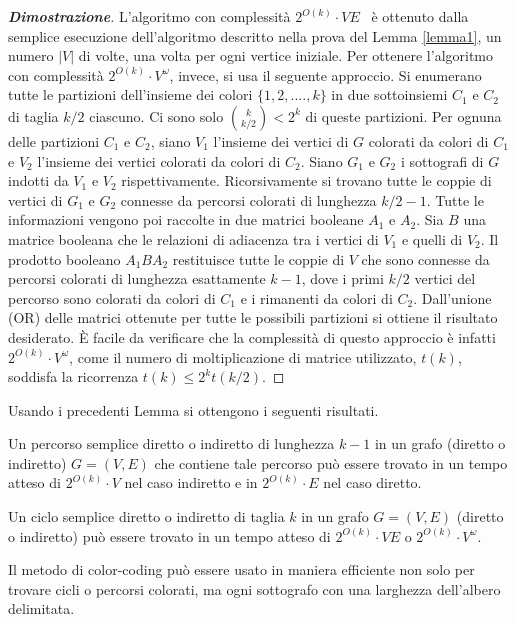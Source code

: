 \begin{proof}[\textbf{Dimostrazione}]
	L'algoritmo con complessit\`a $2^{O(k)} \cdot{VE}$  \ 
	\`e ottenuto dalla semplice esecuzione dell'algoritmo descritto nella prova del Lemma \ref{lemma1}, un numero $|V|$ di volte, una volta per ogni vertice iniziale.
	\newline
	Per ottenere l'algoritmo con complessit\`a $2^{O(k)}\cdot {V^{\omega}}$, invece, si usa il seguente approccio.
	Si enumerano tutte le partizioni dell'insieme dei colori $\{1,2,....,k\}$ in due sottoinsiemi $C_1$ e $C_2$ di taglia $k/2$ ciascuno.
	Ci sono solo $\binom{k}{k/2}<2^k$ di queste partizioni.
	Per ognuna delle partizioni $C_1$ e $C_2$, siano $V_1$ l'insieme dei vertici di $G$ colorati da colori di $C_1$ e $V_2$ l'insieme dei vertici colorati da colori di $C_2$.
	Siano $G_1$ e $G_2$ i sottografi di $G$ indotti da $V_1$ e $V_2$ rispettivamente.
	Ricorsivamente si trovano tutte le coppie di vertici di $ G_1 $ e $ G_2 $ connesse da percorsi colorati di lunghezza $ k/2-1 $.
	Tutte le informazioni vengono poi raccolte in due matrici booleane $ A_1 $ e $ A_2 $.
	Sia $ B $ una matrice booleana che le relazioni di adiacenza tra i vertici di $ V_1 $ e quelli di $ V_2 $.
	Il prodotto booleano $ A_1 B A_2 $ restituisce tutte le coppie di $ V $ che sono connesse da percorsi colorati di lunghezza esattamente $ k-1 $, dove i primi $ k/2 $ vertici del percorso sono colorati da colori di $ C_1 $ e i rimanenti da colori di $ C_2 $.
	Dall'unione (OR) delle matrici ottenute per tutte le possibili partizioni si ottiene il risultato desiderato.
	\`E facile da verificare che la complessit\`a di questo approccio \`e infatti $2^{O(k)}\cdot {V^{\omega}}$, come il numero di moltiplicazione di matrice utilizzato, $ t(k) $, soddisfa la ricorrenza $ t(k) \le 2^{k}t(k/2) $.
\end{proof}

Usando i precedenti Lemma si ottengono i seguenti risultati.

\begin{teorema}
	\label{teorema1}
	Un percorso semplice diretto o indiretto di lunghezza $ k-1 $ in un grafo (diretto o indiretto) $ G =(V,E) $ che contiene tale percorso pu\`o essere trovato in un tempo atteso di $ 2^{O(k)} \cdot V $ nel caso indiretto e in $ 2^{O(k)} \cdot E $ nel caso diretto.
\end{teorema}

\begin{teorema}
	\label{teorema2}
	Un ciclo semplice diretto o indiretto di taglia $ k $ in un grafo $ G=(V,E) $ (diretto o indiretto) pu\`o essere trovato in un tempo atteso di $2^{O(k)} \cdot{VE}$ o $2^{O(k)}\cdot {V^{\omega}}$.
\end{teorema}

Il metodo di color-coding pu\`o essere usato in maniera efficiente non solo per trovare cicli o percorsi colorati, ma ogni sottografo con una larghezza dell'albero delimitata.






	
